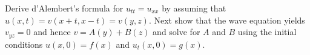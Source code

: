 \item Derive d'Alembert's formula for $u_{tt} = u_{xx}$ by assuming that $u(x, t) = v(x + t, x - t) = v(y, z)$. Next show that the wave equation yields $v_{yz} = 0$ and hence $v = A(y) + B(z)$ and solve for $A$ and $B$ using the initial conditions $u(x, 0) = f(x)$ and $u_t(x, 0) = g(x)$.
\bigbreak
